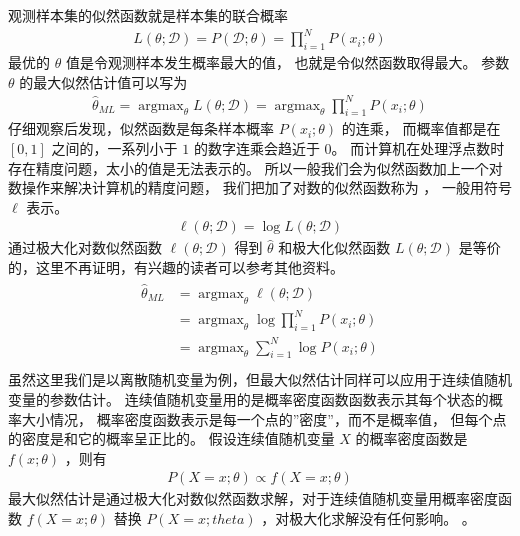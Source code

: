 \documentclass[letterpaper,10pt,english]{sphinxmanual}
\begin{document}
观测样本集的似然函数就是样本集的联合概率
\begin{equation}\label{equation:最大似然估计/content:最大似然估计/content:1}
\begin{split}L(\theta;\mathcal{D}) = P(\mathcal{D};\theta) = \prod_{i=1}^{N} P(x_i;\theta)\end{split}
\end{equation}
最优的 \(\theta\) 值是令观测样本发生概率最大的值，
也就是令似然函数取得最大。
参数 \(\theta\) 的最大似然估计值可以写为
\begin{equation}\label{equation:最大似然估计/content:最大似然估计/content:2}
\begin{split}\hat{\theta}_{ML} = \mathop{\arg \max}_{\theta} L(\theta;\mathcal{D})
= \mathop{\arg \max}_{\theta} \prod_{i=1}^{N} P(x_i;\theta)\end{split}
\end{equation}
仔细观察后发现，似然函数是每条样本概率 \(P(x_i;\theta)\) 的连乘，
而概率值都是在 \([0,1]\) 之间的，一系列小于 \(1\) 的数字连乘会趋近于 \(0\)。
而计算机在处理浮点数时存在精度问题，太小的值是无法表示的。
所以一般我们会为似然函数加上一个对数操作来解决计算机的精度问题，
我们把加了对数的似然函数称为  ，
一般用符号 \(\ell\) 表示。
\begin{equation}\label{equation:最大似然估计/content:最大似然估计/content:3}
\begin{split}\ell(\theta;\mathcal{D}) = \log L(\theta;\mathcal{D})\end{split}
\end{equation}
通过极大化对数似然函数 \(\ell(\theta;\mathcal{D})\) 得到 \(\hat{\theta}\)
和极大化似然函数 \(L(\theta;\mathcal{D})\) 是等价的，这里不再证明，有兴趣的读者可以参考其他资料。
\begin{align}\label{equation:最大似然估计/content:eq_ml_012}\!\begin{aligned}
\hat{\theta}_{ML} &= \mathop{\arg \max}_{\theta}  \ell(\theta;\mathcal{D})\\
&= \mathop{\arg \max}_{\theta} \log \prod_{i=1}^{N} P(x_i;\theta)\\
&= \mathop{\arg \max}_{\theta} \sum_{i=1}^N \log P(x_i;\theta)\\
\end{aligned}\end{align}
虽然这里我们是以离散随机变量为例，但最大似然估计同样可以应用于连续值随机变量的参数估计。
连续值随机变量用的是概率密度函数函数表示其每个状态的概率大小情况，
概率密度函数表示是每一个点的”密度”，而不是概率值，
但每个点的密度是和它的概率呈正比的。
假设连续值随机变量 \(X\) 的概率密度函数是 \(f(x;\theta)\)
，则有
\begin{equation}\label{equation:最大似然估计/content:最大似然估计/content:4}
\begin{split}P(X=x;\theta) \propto f(X=x;\theta)\end{split}
\end{equation}
最大似然估计是通过极大化对数似然函数求解，对于连续值随机变量用概率密度函数 \(f(X=x;\theta)\)
替换 \(P(X=x;theta)\) ，对极大化求解没有任何影响。
。
\end{document}
